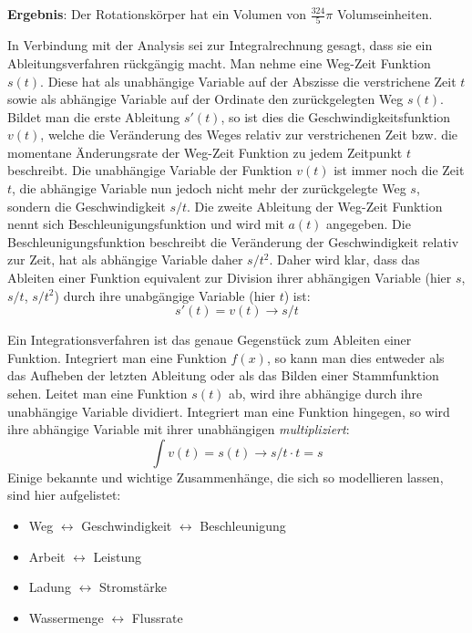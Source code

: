 \textbf{Ergebnis}: Der Rotationsk\"{o}rper hat ein Volumen von $\frac{324}{5}\pi$ Volumseinheiten.

\pagebreak


In Verbindung mit der Analysis sei zur Integralrechnung gesagt, dass sie ein Ableitungsverfahren r\"{u}ckg\"{a}ngig macht. Man nehme eine Weg-Zeit Funktion $s(t)$. Diese hat als unabh\"{a}ngige Variable auf der Abszisse die verstrichene Zeit $t$ sowie als abh\"{a}ngige Variable auf der Ordinate den zur\"{u}ckgelegten Weg $s(t)$. Bildet man die erste Ableitung $s'(t)$, so ist dies die Geschwindigkeitsfunktion $v(t)$, welche die Ver\"{a}nderung des Weges relativ zur verstrichenen Zeit bzw. die momentane \"{A}nderungsrate der Weg-Zeit Funktion zu jedem Zeitpunkt $t$ beschreibt. Die unabh\"{a}ngige Variable der Funktion $v(t)$ ist immer noch die Zeit $t$, die abh\"{a}ngige Variable nun jedoch nicht mehr der zur\"{u}ckgelegte Weg $s$, sondern die Geschwindigkeit $s/t$. Die zweite Ableitung der Weg-Zeit Funktion nennt sich Beschleunigungsfunktion und wird mit $a(t)$ angegeben. Die Beschleunigungsfunktion beschreibt die Ver\"{a}nderung der Geschwindigkeit relativ zur Zeit, hat als abh\"{a}ngige Variable daher $s/t^2$. Daher wird klar, dass das Ableiten einer Funktion equivalent zur Division ihrer abh\"{a}ngigen Variable (hier $s$, $s/t$, $s/t^2$) durch ihre unabg\"{a}ngige Variable (hier $t$) ist: $$s'(t) = v(t) \rightarrow s/t$$

Ein Integrationsverfahren ist das genaue Gegenst\"{u}ck zum Ableiten einer Funktion. Integriert man eine Funktion $f(x)$, so kann man dies entweder als das Aufheben der letzten Ableitung oder als das Bilden einer Stammfunktion sehen. Leitet man eine Funktion $s(t)$ ab, wird ihre abh\"{a}ngige durch ihre unabh\"{a}ngige Variable dividiert. Integriert man eine Funktion hingegen, so wird ihre abh\"{a}ngige Variable mit ihrer unabh\"{a}ngigen \emph{multipliziert}: $$\int v(t) = s(t) \rightarrow s/t \cdot t = s$$ Einige bekannte und wichtige Zusammenh\"{a}nge, die sich so modellieren lassen, sind hier aufgelistet:

\begin{itemize}
	\item Weg $\longleftrightarrow$ Geschwindigkeit $\longleftrightarrow$ Beschleunigung

	\item Arbeit $\longleftrightarrow$ Leistung

	\item Ladung $\longleftrightarrow$ Stromst\"{a}rke

	\item Wassermenge $\longleftrightarrow$ Flussrate
\end{itemize}

